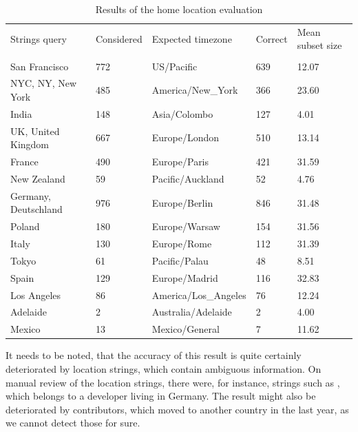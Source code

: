\begin{table}[]
    \centering
    \begin{tabular}{lllll}
        Strings query        & Considered & Expected timezone    & Correct & Mean subset size \\
        & & & & \\
        San Francisco        & 772        & US/Pacific           & 639     & 12.07  \\
        NYC, NY, New York    & 485        & America/New\_York    & 366     & 23.60  \\
        India                & 148        & Asia/Colombo         & 127     & 4.01   \\
        UK, United Kingdom   & 667        & Europe/London        & 510     & 13.14  \\
        France               & 490        & Europe/Paris         & 421     & 31.59  \\
        New Zealand          & 59         & Pacific/Auckland     & 52      & 4.76   \\
        Germany, Deutschland & 976        & Europe/Berlin        & 846     & 31.48  \\
        Poland               & 180        & Europe/Warsaw        & 154     & 31.56  \\
        Italy                & 130        & Europe/Rome          & 112     & 31.39  \\
        Tokyo                & 61         & Pacific/Palau        & 48      & 8.51   \\
        Spain                & 129        & Europe/Madrid        & 116     & 32.83  \\
        Los Angeles          & 86         & America/Los\_Angeles & 76      & 12.24  \\
        Adelaide             & 2          & Australia/Adelaide   & 2       & 4.00   \\
        Mexico               & 13         & Mexico/General       & 7       & 11.62
    \end{tabular}
    \caption{Results of the home location evaluation}\label{home-location-table}
\end{table}

It needs to be noted, that the accuracy of this result is quite certainly deteriorated by location strings, which contain ambiguous information.
On manual review of the location strings, there were, for instance, strings such as , which belongs to a developer living in Germany.
The result might also be deteriorated by contributors, which moved to another country in the last year, as we cannot detect those for sure.

